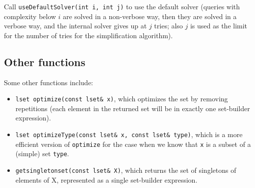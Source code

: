 Call {\tt useDefaultSolver(int i, int j)} to use the default solver (queries with
complexity below $i$ are solved in a non-verbose way, then they are solved in a verbose
way, and the internal solver gives up at $j$ tries; also $j$ is used as the limit for
the number of tries for the simplification algorithm).

\subsection{Other functions}
Some other functions include:
\begin{itemize}
\item {\tt lset optimize(const lset\& x)}, which optimizes the set by removing repetitions
(each element in the returned set will be in exactly one set-builder expression).
\item {\tt lset optimizeType(const lset\& x, const lset\& type)}, which is a more efficient version of
{\tt optimize} for the case when we know that {\tt x} is a subset of a (simple) set
{\tt type}.
\item {\tt getsingletonset(const lset\& X)}, which returns the set of singletons of elements of X,
represented as a single set-builder expression.

\end{itemize}
